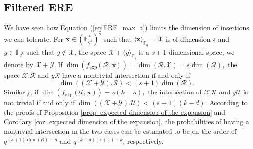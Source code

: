 \documentclass{article}
\newcommand{\Fq}{\mathbb{F}_{q}}
\newcommand{\Fqk}{\mathbb{F}_{q^k}}
\newcommand{\calR}{\mathcal{R}}
\newcommand{\calU}{\mathcal{U}}
\newcommand{\calX}{\mathcal{X}}
\newcommand{\calY}{\mathcal{Y}}
\newcommand{\fexp}{f_{\mathrm{exp}}}
\newcommand{\Span}[2]{\langle #2 \rangle_{#1}}
\begin{document}
\subsection{Filtered ERE}
\label{subsec:filtered ERE}
We have seen how Equation (\ref{eq:ERE_max_t}) limits the dimension of insertions we can tolerate.
For $\bm x \in (\Fqk^*)^s$ such that $\Span{\Fq}{\bm x} = \calX$ is of dimension $s$ and $y \in \Fqk$ such that $y\notin \calX$, the space $\calX + \Span{\Fq}{y}$ is a $s+1$-dimensional space, we denote by $\calX + \calY$.
If $\dim(\fexp(\calR, \bm x)) = \dim(\calR.\calX) = s \dim(\calR),$ the space $\calX.\calR$ and $y \calR$ have a nontrivial intersection if and only if 
$$
\dim((\calX + \calY).\calR) < (s+1)\dim(\calR).
$$
Similarly, if $\dim(\fexp(\calU,\bm x))=s(k-d),$ the intersection of $\calX.\calU$ and $y \calU$ is not trivial if and only if $\dim((\calX+\calY).\calU) < (s+1)(k-d).$
According to the proofs of Proposition \ref{prop: expected dimension of the expansion} and Corollary \ref{cor: expected dimension of the expansion}, the probabilities of having a nontrivial intersection in the two cases can be estimated to be on the order of $q^{(s+1) \dim(R) - n}$ and $q^{(k-d)(s+1) - k}$, respectively. 
\end{document}
